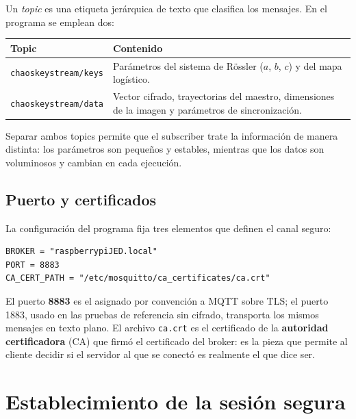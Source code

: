 \documentclass[12pt,a4paper]{article}
\begin{document}
Un \textit{topic} es una etiqueta jerárquica de texto que clasifica los mensajes. En el programa se emplean dos:

\begin{center}
\begin{tabularx}{0.92\textwidth}{@{}l X@{}}
\toprule
\textbf{Topic} & \textbf{Contenido} \\
\midrule
\texttt{chaoskeystream/keys} & Parámetros del sistema de Rössler ($a$, $b$, $c$) y del mapa logístico. \\
\texttt{chaoskeystream/data} & Vector cifrado, trayectorias del maestro, dimensiones de la imagen y parámetros de sincronización. \\
\bottomrule
\end{tabularx}
\end{center}

Separar ambos topics permite que el subscriber trate la información de manera distinta: los parámetros son pequeños y estables, mientras que los datos son voluminosos y cambian en cada ejecución.

\subsection{Puerto y certificados}

La configuración del programa fija tres elementos que definen el canal seguro:

\begin{lstlisting}[caption={Configuración del canal en \texttt{Maestro\_TLS\_Principal.py}}]
BROKER = "raspberrypiJED.local"
PORT = 8883
CA_CERT_PATH = "/etc/mosquitto/ca_certificates/ca.crt"
\end{lstlisting}

El puerto \textbf{8883} es el asignado por convención a MQTT sobre TLS; el puerto 1883, usado en las pruebas de referencia sin cifrado, transporta los mismos mensajes en texto plano. El archivo \texttt{ca.crt} es el certificado de la \textbf{autoridad certificadora} (CA) que firmó el certificado del broker: es la pieza que permite al cliente decidir si el servidor al que se conectó es realmente el que dice ser.

\section{Establecimiento de la sesión segura}
\end{document}
